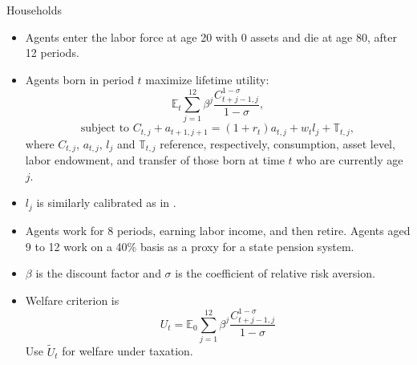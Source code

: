 \documentclass[aspectratio=169,11pt]{beamer}
\newcommand{\keyc}[1]{\textcolor{uzhblue}{#1}}
\begin{document}
\begin{frame}[fragile]{Households}
\begin{footnotesize}
\begin{itemize}
    \item Agents enter the labor force at age 20 with 0 assets and die at age 80, after 12 periods.
    \item Agents born in period $t$ maximize lifetime utility:
    \begin{equation}
 {\mathbb E}_t \sum\limits_{j = 1}^{12} \beta^j \frac{C_{t+j-1, j}^{1-\sigma}}{1-\sigma} ,
\end{equation}
\begin{equation}
\text{subject to } C_{t,j}+a_{t+1, j+1}=(1+r_t)a_{t,j} +w_{t} l_{j} + \mathbb{T}_{t,j},
\end{equation}
where $C_{t,j}$, $a_{t,j}$, $l_{j}$ and $\mathbb{T}_{t,j}$ reference, respectively, \keyc{consumption, asset level, labor endowment, and transfer} of those born at time $t$ who are currently age $j$.
\item $l_{j}$ is similarly calibrated as in \cite{kotlikoff2021making}. \item Agents work for 8 periods, earning labor income, and then retire. Agents aged 9 to 12 work on a 40\% basis as a proxy for a state pension system.
\item $\beta$ is the discount factor and $\sigma$ is the coefficient of relative risk aversion.
\item Welfare criterion is
$$ U_t= {\mathbb E}_0  \sum\limits_{j = 1}^{12} \beta^j \frac{C_{t+j-1, j}^{1-\sigma}}{1-\sigma} $$
Use $ \tilde U_t $ for welfare under taxation.
\end{itemize}
\end{footnotesize}
\end{frame}
\end{document}
